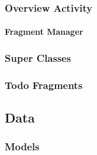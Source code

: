 	\subsubsection{Overview Activity}
		\paragraph{Fragment Manager}
	\subsubsection{Super Classes}
	\subsubsection{Todo Fragments}


\subsection{Data}
	\subsubsection{Models}
